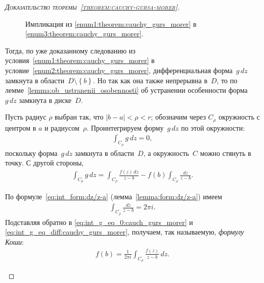 \documentclass[../complex-analysis.tex]{subfiles}
\begin{document}
\begin{proof}[\normalfont\textsc{Доказательство теоремы~\ref{theorem:cauchy-gursa-morer}}]
\begin{itemize}
   \begin{figure}[ht]
    \centering
    \caption{Импликация из \ref{enum1:theorem:cauchy_gurs_morer} в \ref{enum3:theorem:cauchy_gurs_morer}.}
    \label{fig:theorem_cauchy_gurs_morer_1_to_3}
   \end{figure}

   Тогда, по уже доказанному следованию из условия~\ref{enum1:theorem:cauchy_gurs_morer} в условие~\ref{enum2:theorem:cauchy_gurs_morer}, дифференциальная форма~$ g\,dz $ замкнута в области~$ D \setminus \left\{ b \right\} $. Но так как она также непрерывна в~$ D $, то по лемме~\ref{lemma:ob_ustranenii_osobennosti} об устранении особенности форма $ g\,dz $ замкнута в диске~$ D $.

   Пусть радиус $ \rho $ выбран так, что $ \left| b-a \right| < \rho < r $; обозначим через $ C_\rho $  окружность с центром в $ a $  и радиусом~$ \rho $. Проинтегрируем форму~$ g\,dz $ по этой окружности:
   \begin{align}
    \label{eq:int_g_eq_0:cauch_gurs_morer}
    \int_{C_\rho} g\,dz = 0,
   \end{align} поскольку форма~$ g\,dz $ замкнута в области~$ D $, а окружность~$ C $ можно стянуть в точку. С другой стороны,
   \begin{align}
    \label{eq:int_g_eq_diff:cauchy_gurs_morer}
    \int_{C_\rho} g\,dz = \int_{C_\rho} \frac{f(z)\,dz}{z-b} - f(b) \int_{C_\rho} \frac{dz}{z-b}.
   \end{align}

   По формуле~\eqref{eq:int_form:dz/z-a} (лемма~\ref{lemma:form:dz/z-a}) имеем
   \begin{align*}
    \int_{C_\rho} \frac{dz}{z-b} = 2\pi i.
   \end{align*} Подставляя обратно в \eqref{eq:int_g_eq_0:cauch_gurs_morer} и \eqref{eq:int_g_eq_diff:cauchy_gurs_morer}, получаем, так называемую, \emph{формулу Коши}:
   \begin{align}
    \label{eq:cauchy_formula:cauchy_gurs_morer}
    f(b) = \frac{1}{2\pi i} \int_{C_\rho} \frac{f(z)}{z-b}\,dz.
   \end{align}


\end{itemize}
\end{proof}
\end{document}
